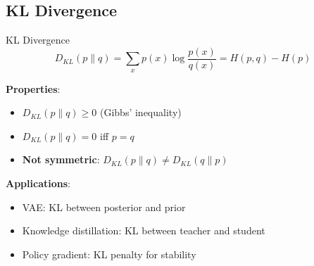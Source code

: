 \subsection{KL Divergence}

\begin{mathresult}{KL Divergence}
\begin{equation}
D_{KL}(p \| q) = \sum_x p(x) \log \frac{p(x)}{q(x)} = H(p, q) - H(p)
\end{equation}
\end{mathresult}

\textbf{Properties}:
\begin{itemize}
    \item $D_{KL}(p \| q) \geq 0$ (Gibbs' inequality)
    \item $D_{KL}(p \| q) = 0$ iff $p = q$
    \item \textbf{Not symmetric}: $D_{KL}(p \| q) \neq D_{KL}(q \| p)$
\end{itemize}

\textbf{Applications}:
\begin{itemize}
    \item VAE: KL between posterior and prior
    \item Knowledge distillation: KL between teacher and student
    \item Policy gradient: KL penalty for stability
\end{itemize}

